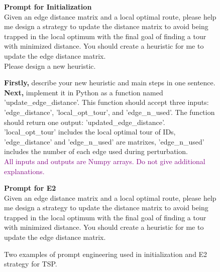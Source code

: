 \begin{figure}[htbp]
    \centering
    \caption{Two examples of prompt engineering used in initialization and E2 strategy for TSP.}
    \label{fig:prompt_tsp}

\begin{minipage}{0.38\textwidth}
\small
\begin{dialogbox}
  \textbf{Prompt for Initialization} \\
  
  \textcolor {darkbrown}{ Given an edge distance matrix and a local optimal route, please help me design a strategy to update the distance matrix to avoid being trapped in the local optimum with the final goal of finding a tour with minimized distance. You should create a heuristic for me to update the edge distance matrix.} \\

  Please design a new heuristic.
  
  \textbf{Firstly,} describe your \textcolor{navyblue}{new heuristic and main steps in one sentence}. \\
  \textbf{Next,} implement it in Python as a function named \textcolor{navyblue}{'update\_edge\_distance'}. This function should accept \textcolor{navyblue}{three inputs: 'edge\_distance', 'local\_opt\_tour', and 'edge\_n\_used'}. The function should return \textcolor{navyblue}{one output: 'updated\_edge\_distance'}. \textcolor{navyblue}{'local\_opt\_tour' includes the local optimal tour of IDs, 'edge\_distance' and 'edge\_n\_used' are matrixes, 'edge\_n\_used' includes the number of each edge used during perturbation.}  \\

  \textcolor{purple}{All inputs and outputs are Numpy arrays. Do not give additional explanations.}
\end{dialogbox}
\end{minipage}
\begin{minipage}{0.61\textwidth}
\small
\begin{dialogbox}
  \textbf{Prompt for E2} \\
  
  \textcolor[HTML]{8B4513}{ Given an edge distance matrix and a local optimal route, please help me design a strategy to update the distance matrix to avoid being trapped in the local optimum with the final goal of finding a tour with minimized distance. You should create a heuristic for me to update the edge distance matrix.} \\


\end{dialogbox}
\end{minipage}
\end{figure}
